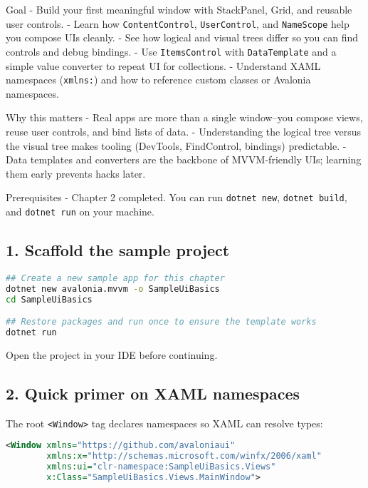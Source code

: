 Goal - Build your first meaningful window with StackPanel, Grid, and
reusable user controls. - Learn how
\passthrough{\lstinline!ContentControl!},
\passthrough{\lstinline!UserControl!}, and
\passthrough{\lstinline!NameScope!} help you compose UIs cleanly. - See
how logical and visual trees differ so you can find controls and debug
bindings. - Use \passthrough{\lstinline!ItemsControl!} with
\passthrough{\lstinline!DataTemplate!} and a simple value converter to
repeat UI for collections. - Understand XAML namespaces
(\passthrough{\lstinline!xmlns:!}) and how to reference custom classes
or Avalonia namespaces.

Why this matters - Real apps are more than a single window--you compose
views, reuse user controls, and bind lists of data. - Understanding the
logical tree versus the visual tree makes tooling (DevTools,
FindControl, bindings) predictable. - Data templates and converters are
the backbone of MVVM-friendly UIs; learning them early prevents hacks
later.

Prerequisites - Chapter 2 completed. You can run
\passthrough{\lstinline!dotnet new!},
\passthrough{\lstinline!dotnet build!}, and
\passthrough{\lstinline!dotnet run!} on your machine.

\subsection{1. Scaffold the sample
project}\label{scaffold-the-sample-project}

\begin{lstlisting}[language=bash]
## Create a new sample app for this chapter
dotnet new avalonia.mvvm -o SampleUiBasics
cd SampleUiBasics

## Restore packages and run once to ensure the template works
dotnet run
\end{lstlisting}

Open the project in your IDE before continuing.

\subsection{2. Quick primer on XAML
namespaces}\label{quick-primer-on-xaml-namespaces}

The root \passthrough{\lstinline!<Window>!} tag declares namespaces so
XAML can resolve types:

\begin{lstlisting}[language=XML]
<Window xmlns="https://github.com/avaloniaui"
        xmlns:x="http://schemas.microsoft.com/winfx/2006/xaml"
        xmlns:ui="clr-namespace:SampleUiBasics.Views"
        x:Class="SampleUiBasics.Views.MainWindow">
\end{lstlisting}

